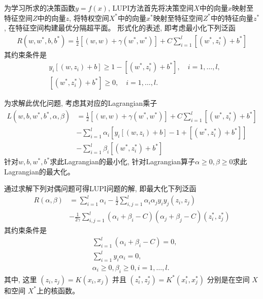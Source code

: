 为学习所求的决策函数$y = f(x)$, LUPI方法首先将决策空间$X$中的向量$x$映射至特征空间$Z$中的向量$z$, 将特权空间$X^{*}$中的向量$x^{*}$映射至特征空间$Z^{*}$中的特征向量$z^{*}$, 在特征空间构建最优分隔超平面。 形式化的表述, 即考虑最小化下列泛函
\begin{align}
R(w, w^{*}, b, b^{*}) = \frac{1}{2}[(w, w) + \gamma (w^{*}, w^{*})] + C\sum_{i=1}^{l}[(w^{*}, z_{i}^{*}) + b^{*}]
\end{align}
其约束条件是
\begin{align}
&y_{i}[(w, z_{i}) + b] \geq 1 - [(w^{*}, z_{i}^{*}) + b^{*}], \quad i = 1, \ldots, l,\\
&[(w^{*}, z_{i}^{*}) + b^{*}] \geq 0, \quad i= 1, \ldots, l.
\end{align}

为求解此优化问题, 考虑其对应的Lagrangian乘子
\begin{equation}
\begin{aligned}
L(w, b, w^{*}, b^{*}, \alpha, \beta) &= \frac{1}{2}[(w, w) + \gamma (w^{*}, w^{*})] + C\sum_{i=1}^{l}[(w^{*}, z_{i}^{*}) + b^{*}]\\
& - \sum_{i=1}^{l}\alpha_{i}\left[y_{i}[(w, z_{i}) + b] - 1 + [(w^{*}, z_{i}^{*}) + b^{*}]\right]\\
& - \sum_{i=1}^{l}\beta_{i}\left[(w^{*}, z_{i}^{*}) + b^{*}\right]
\end{aligned}
\end{equation}
针对$w,b,w^{*},b^{*}$求此Lagrangian的最小化, 针对Lagrangian算子$\alpha \geq 0, \beta \geq 0$求此Lagrangian的最大化。

通过求解下列对偶问题可得LUPI问题的解, 即最大化下列泛函
\begin{equation}
\begin{aligned}
R(\alpha, \beta) &= \sum_{i=1}^{l}\alpha_{i} - \frac{1}{2}\sum_{i,j=1}^{l}\alpha_{i}\alpha_{j}y_{i}y_{j}(z_{i},z_{j})\\
& - \frac{1}{2\gamma}\sum_{i,j=1}^{l}(\alpha_{i} + \beta_{i} - C)(\alpha_{j} + \beta_{j} - C)(z_{i}^{*}, z_{j}^{*})
\end{aligned}
\end{equation}
其约束条件是
\begin{align}
&\sum_{i=1}^{l}(\alpha_{i} + \beta_{i} - C) = 0,\\
&\sum_{i=1}^{l}y_{i}\alpha_{i} = 0,\\
&\alpha_{i} \geq 0, \beta_{i} \geq 0, i = 1,\ldots,l.
\end{align}
其中, 这里 $(z_{i},z_{j}) = K(x_{i}, x_{j})$ 并且 $(z_{i}^{*}, z_{j}^{*}) = K^{*}(x_{i}^{*}, x_{j}^{*})$ 分别是在空间 $X$ 和空间 $X^{*}$上的核函数。

